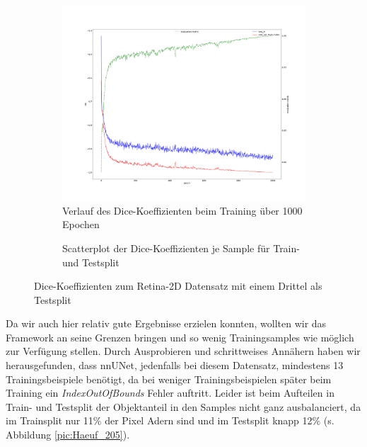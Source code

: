 \begin{figure}[H]
\centering
\begin{minipage}{.6\textwidth}
\begin{subfigure}{\textwidth}
\centering
\includegraphics[width=\textwidth]{Pictures/nnUnet/Praxis/Task203-Augen-drittel-testsplit/progress_203-Augen-drittel-split.png}
\caption{Verlauf des Dice-Koeffizienten beim Training über 1000 Epochen}
\label{pic:Prog_203}
\end{subfigure}
\end{minipage}%
\begin{minipage}{.4\textwidth}
\begin{subfigure}{\textwidth}

\caption{Scatterplot der Dice-Koeffizienten je Sample für Train- und Testsplit}
\label{pic:Dice_203}
\end{subfigure}
\end{minipage}

\caption{Dice-Koeffizienten zum Retina-2D Datensatz \cite{retina2d} mit einem Drittel als Testsplit}
\end{figure}

Da wir auch hier relativ gute Ergebnisse erzielen konnten, wollten wir das Framework an seine Grenzen bringen und so wenig Trainingsamples wie möglich zur Verfügung stellen. Durch Ausprobieren und schrittweises Annähern haben wir herausgefunden, dass nnUNet, jedenfalls bei diesem Datensatz, mindestens 13 Trainingsbeispiele benötigt, da bei weniger Trainingsbeispielen später beim Training ein \textit{IndexOutOfBounds} Fehler auftritt. Leider ist beim Aufteilen in Train- und Testsplit der Objektanteil in den Samples nicht ganz ausbalanciert, da im Trainsplit nur 11\% der Pixel Adern sind und im Testsplit knapp 12\% (s. Abbildung \ref{pic:Haeuf_205}).


